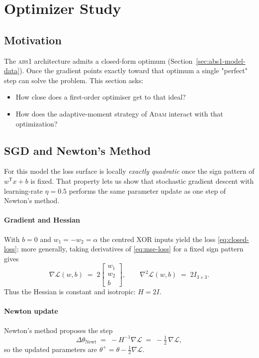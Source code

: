 ﻿%
\section{Optimizer Study}
\label{sec:abs1-optim}

\subsection*{Motivation}

The \textsc{abs1} architecture admits a closed-form optimum (Section~\ref{sec:abs1-model-data}).  
Once the gradient points exactly toward that optimum a single "perfect" step can solve the problem.  
This section asks:

\begin{itemize}
    \item How close does a first-order optimiser get to that ideal?
    \item How does the adaptive-moment strategy of \textsc{Adam} interact with that optimization?
\end{itemize}

\subsection*{SGD and Newton's Method}
\label{sec:sgd-newton}

For this model the loss surface is locally \emph{exactly quadratic} once the
sign pattern of $w^{\mathsf T}x+b$ is fixed.  That property lets us show that
stochastic gradient descent with learning-rate $\eta=0.5$ performs the same
parameter update as one step of Newton's method.

\paragraph{Gradient and Hessian}
With $b=0$ and $w_1=-w_2=\alpha$ the centred XOR inputs yield the loss
\eqref{eq:closed-loss}; more generally, taking derivatives of
\eqref{eq:mse-loss} for a fixed sign pattern gives
\[
    \nabla\! \mathcal L(w,b) \;=\; 2\begin{bmatrix}w_1\\ w_2\\ b\end{bmatrix},
    \qquad
    \nabla^2\! \mathcal L(w,b) \;=\; 2I_{3\times3}.
\]
Thus the Hessian is constant and isotropic: \(H = 2I\).

\paragraph{Newton update}
Newton's method proposes the step
\[
    \Delta\theta_{\text{Newt}}
    \;=\;
    -H^{-1}\nabla\! \mathcal L
    \;=\;
    -\tfrac12\,\nabla\! \mathcal L,
\]
so the updated parameters are
\(
    \theta^{+} = \theta - \tfrac12 \nabla\! \mathcal L.
\)

